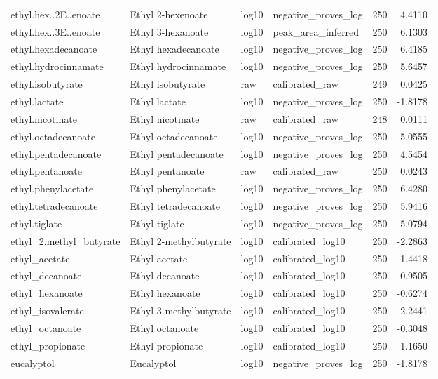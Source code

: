 {\begin{longtable}{llllrr}
ethyl.hex..2E..enoate & Ethyl 2-hexenoate & log10 & negative\_proves\_log & 250 & 4.4110 \\
ethyl.hex..3E..enoate & Ethyl 3-hexanoate & log10 & peak\_area\_inferred & 250 & 6.1303 \\
ethyl.hexadecanoate & Ethyl hexadecanoate & log10 & negative\_proves\_log & 250 & 6.4185 \\
ethyl.hydrocinnamate & Ethyl hydrocinnamate & log10 & negative\_proves\_log & 250 & 5.6457 \\
ethyl.isobutyrate & Ethyl isobutyrate & raw & calibrated\_raw & 249 & 0.0425 \\
ethyl.lactate & Ethyl lactate & log10 & negative\_proves\_log & 250 & -1.8178 \\
ethyl.nicotinate & Ethyl nicotinate & raw & calibrated\_raw & 248 & 0.0111 \\
ethyl.octadecanoate & Ethyl octadecanoate & log10 & negative\_proves\_log & 250 & 5.0555 \\
ethyl.pentadecanoate & Ethyl pentadecanoate & log10 & negative\_proves\_log & 250 & 4.5454 \\
ethyl.pentanoate & Ethyl pentanoate & raw & calibrated\_raw & 250 & 0.0243 \\
ethyl.phenylacetate & Ethyl phenylacetate & log10 & negative\_proves\_log & 250 & 6.4280 \\
ethyl.tetradecanoate & Ethyl tetradecanoate & log10 & negative\_proves\_log & 250 & 5.9416 \\
ethyl.tiglate & Ethyl tiglate & log10 & negative\_proves\_log & 250 & 5.0794 \\
ethyl\_2.methyl\_butyrate & Ethyl 2-methylbutyrate & log10 & calibrated\_log10 & 250 & -2.2863 \\
ethyl\_acetate & Ethyl acetate & log10 & calibrated\_log10 & 250 & 1.4418 \\
ethyl\_decanoate & Ethyl decanoate & log10 & calibrated\_log10 & 250 & -0.9505 \\
ethyl\_hexanoate & Ethyl hexanoate & log10 & calibrated\_log10 & 250 & -0.6274 \\
ethyl\_isovalerate & Ethyl 3-methylbutyrate & log10 & calibrated\_log10 & 250 & -2.2441 \\
ethyl\_octanoate & Ethyl octanoate & log10 & calibrated\_log10 & 250 & -0.3048 \\
ethyl\_propionate & Ethyl propionate & log10 & calibrated\_log10 & 250 & -1.1650 \\
eucalyptol & Eucalyptol & log10 & negative\_proves\_log & 250 & -1.8178 \\

\end{longtable}}
